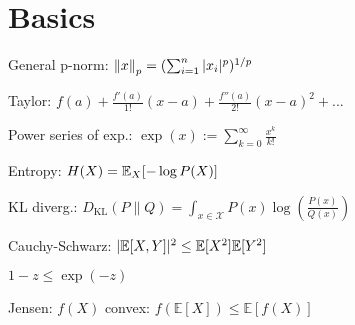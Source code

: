 \section{Basics}
\begin{inparaitem}[\color{black}\textbullet]
    \item General p-norm: $\left\lVert x \right\rVert_p = (\sum_{i=1}^n |x_i|^p)^{1/p}$\\
    \item Taylor: $f(a)+\tfrac{f'(a)}{1!}(x-a) + \tfrac{f''(a)}{2!}(x-a)^2 + ...$ \\
    \item Power series of exp.: $\exp(x) := \sum_{k = 0}^{\infty} \frac{x^k}{k!}$\\
    \item Entropy: $H(X)=\mathbb E_X[-\log P(X)]$\\
    \item KL diverg.: $D_\text{KL}(P \parallel Q) = \int_{x\in\mathcal{X}} P(x) \log\left(\frac{P(x)}{Q(x)}\right)$\\
    \item Cauchy-Schwarz: $|\mathbb E[X,Y]|^2 \leq \mathbb E[X^2] \mathbb E[Y^2]$ \\
    \item $1-z\leq\exp(-z)$\\
    \item Jensen: $f(X)$ convex: $f(\mathbb{E}[X]) \leq \mathbb{E}[f(X)]$
\end{inparaitem}

